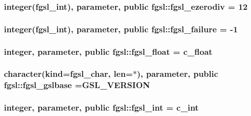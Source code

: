 \hypertarget{classfgsl_a13b65889d69077a99a6f13522883061f}{
\subsubsection[{fgsl\-\_\-ezerodiv}]{\setlength{\rightskip}{0pt plus 5cm}integer({\bf fgsl\-\_\-int}), parameter, public fgsl\-::fgsl\-\_\-ezerodiv = 12}}\label{classfgsl_a13b65889d69077a99a6f13522883061f}
\hypertarget{classfgsl_a4cb2b20fedfc04419dd412d3bdc635e0}{
\subsubsection[{fgsl\-\_\-failure}]{\setlength{\rightskip}{0pt plus 5cm}integer({\bf fgsl\-\_\-int}), parameter, public fgsl\-::fgsl\-\_\-failure = -\/1}}\label{classfgsl_a4cb2b20fedfc04419dd412d3bdc635e0}
\hypertarget{classfgsl_a5721fab55a48ca577c4557fdb1861eb6}{
\subsubsection[{fgsl\-\_\-float}]{\setlength{\rightskip}{0pt plus 5cm}integer, parameter, public fgsl\-::fgsl\-\_\-float = c\-\_\-float}}\label{classfgsl_a5721fab55a48ca577c4557fdb1861eb6}
\hypertarget{classfgsl_ad8d3e2a5a480d0a6e9569ef516c5dff4}{
\subsubsection[{fgsl\-\_\-gslbase}]{\setlength{\rightskip}{0pt plus 5cm}character(kind={\bf fgsl\-\_\-char}, len=$\ast$), parameter, public fgsl\-::fgsl\-\_\-gslbase =G\-S\-L\-\_\-\-V\-E\-R\-S\-I\-O\-N}}\label{classfgsl_ad8d3e2a5a480d0a6e9569ef516c5dff4}
\hypertarget{classfgsl_a222deda1d7a0c0e845ce4a683318efeb}{
\subsubsection[{fgsl\-\_\-int}]{\setlength{\rightskip}{0pt plus 5cm}integer, parameter, public fgsl\-::fgsl\-\_\-int = c\-\_\-int}}\label{classfgsl_a222deda1d7a0c0e845ce4a683318efeb}
